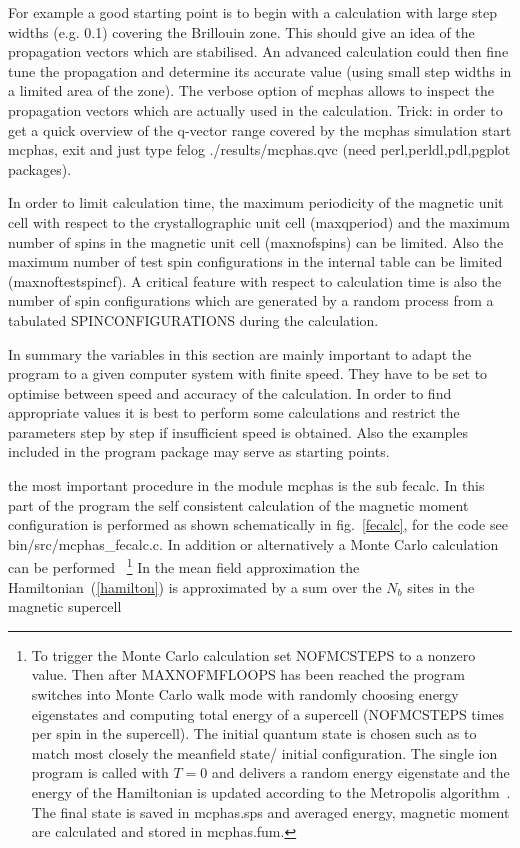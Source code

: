 \begin{description}
For example a good starting point is to begin with a calculation with large
step widths (e.g. 0.1)  covering the Brillouin zone. This should give an idea
of the propagation vectors which are stabilised. An advanced calculation
could then fine tune the propagation and determine its accurate value (using
small step widths in a limited area of the zone).
The verbose option of {\prg mcphas} allows to inspect the propagation vectors
which are actually used in the calculation.
Trick: in order to get a quick overview of the
q-vector range covered by the mcphas simulation start mcphas, exit and 
just type {\prg felog ./results/mcphas.qvc} (need {\prg perl,perldl,pdl,pgplot} packages).

In order to limit calculation time, the maximum periodicity
of the magnetic unit cell with respect to the crystallographic unit cell 
(maxqperiod) and the maximum number of spins in the magnetic unit cell 
(maxnofspins) can be limited. Also the maximum number of test spin configurations
in the internal table can be limited (maxnoftestspincf).
A critical feature with respect to calculation time is also the number of
spin configurations which are generated by a random process from a tabulated
SPINCONFIGURATIONS during the calculation. 

In summary the variables in this section are mainly important to adapt the
program to a given computer system with finite speed. They have to be set
to optimise between speed and accuracy of the calculation. In order to
find appropriate values it is best to perform some calculations 
and restrict the parameters step by step if insufficient speed is obtained.
Also the examples included in the program package may serve as starting
points.

\item [PARAMETERS FOR SUB FECALC SELFCONSISTENCY PROCESS:]
 the most important
procedure in the module {\prg mcphas} is the sub {\prg fecalc}. In this part of the 
program the self consistent calculation of the magnetic moment configuration
is performed 
as shown schematically in fig.~\ref{fecalc}, for the code see bin/src/mcphas\_fecalc.c. 
In addition or alternatively a Monte Carlo calculation can be performed
~\footnote{
To trigger the Monte Carlo calculation set NOFMCSTEPS to a nonzero value. Then
after MAXNOFMFLOOPS has been reached the program switches into Monte Carlo walk mode with randomly
choosing energy eigenstates and computing total energy of a supercell
(NOFMCSTEPS times per spin in the supercell).  
The initial quantum state is chosen such as to match most closely the meanfield state/ initial
configuration. The single ion program is called with $T=0$ and delivers a random energy eigenstate
and the energy of the Hamiltonian is updated according to the Metropolis algorithm~\cite{metropolis53-1087}.
The final state is saved in {\prg mcphas.sps} and averaged energy, magnetic moment are calculated and stored
in {\prg mcphas.fum}.  
}
In the mean field approximation the Hamiltonian~(\ref{hamilton}) is approximated
by a sum over the $N_b$ sites in the magnetic supercell


\end{description}
